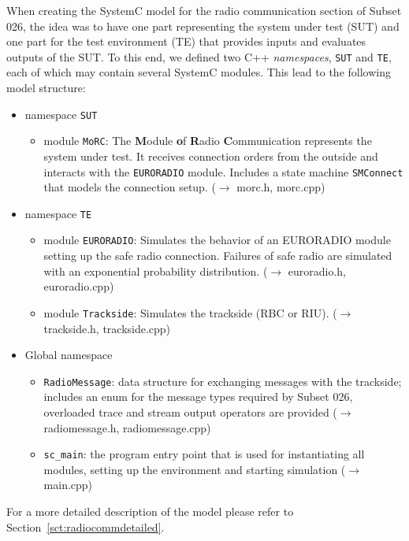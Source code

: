\documentclass{template/openetcs_article}
\begin{document}
When creating the SystemC model for the radio communication section of Subset 026, the idea was to have one part representing the system under test (SUT) and one part for the test environment (TE) that provides inputs and evaluates outputs of the SUT. To this end, we defined two C++ \emph{namespaces}, \verb|SUT| and \verb|TE|, each of which may contain several SystemC modules. This lead to the following model structure:
\begin{itemize}
  \item namespace \verb|SUT|
    \begin{itemize}
      \item module \verb|MoRC|: The \textbf{M}odule \textbf{o}f \textbf{R}adio \textbf{C}ommunication represents the system under test. It receives connection orders from the outside and interacts with the \verb|EURORADIO| module. Includes a state machine \verb|SMConnect| that models the connection setup. ($\rightarrow$ morc.h, morc.cpp)
    \end{itemize}

  \item namespace \verb|TE|
    \begin{itemize}
      \item module \verb|EURORADIO|: Simulates the behavior of an EURORADIO module setting up the safe radio connection. Failures of safe radio are simulated with an exponential probability distribution. ($\rightarrow$ euroradio.h, euroradio.cpp)
      \item module \verb|Trackside|: Simulates the trackside (RBC or RIU). ($\rightarrow$ trackside.h, trackside.cpp)
    \end{itemize}
  \item Global namespace
    \begin{itemize}
      \item \verb|RadioMessage|: data structure for exchanging messages with the trackside; includes an enum for the message types required by Subset 026, overloaded trace and stream output operators are provided ($\rightarrow$ radiomessage.h, radiomessage.cpp)
      \item \verb|sc_main|: the program entry point that is used for instantiating all modules, setting up the environment and starting simulation ($\rightarrow$ main.cpp)
    \end{itemize}
\end{itemize}

For a more detailed description of the model please refer to Section~\ref{sct:radiocommdetailed}.
\end{document}
